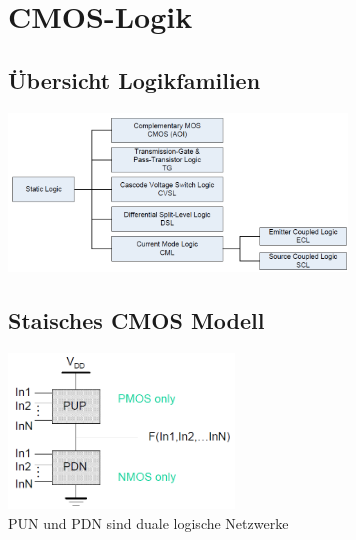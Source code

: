 \section{CMOS-Logik}
	\begin{multicols}{2}
		\subsection{\"Ubersicht Logikfamilien}
			\includegraphics[width=9cm]{bilder/cmosOverview.png}
		\subsection{Staisches CMOS Modell}
			\includegraphics[width=6cm]{bilder/cmosPrinzip.png}\\
			PUN und PDN sind duale logische Netzwerke\\
	\end{multicols}

